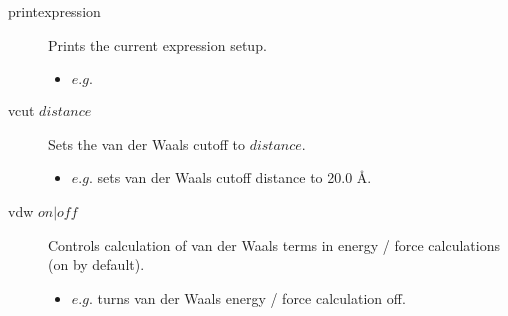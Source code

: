 \begin{description}
	\item[printexpression\its] Prints the current expression setup.
	\begin{itemize}
		\item $e.g.$ 
	\end{itemize}

	\item[vcut $distance$\its] Sets the van der Waals cutoff to $distance$.
	\begin{itemize}
		\item $e.g.$  sets van der Waals cutoff distance to 20.0 \AA.
	\end{itemize}

	\item[vdw $on|off$\its] Controls calculation of van der Waals terms in energy / force calculations (on by default).
	\begin{itemize}
		\item $e.g.$  turns van der Waals energy / force calculation off.
	\end{itemize}

\end{description}

